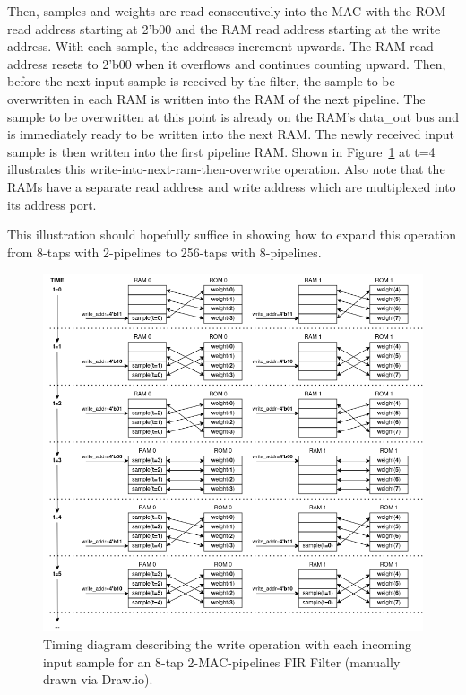 \documentclass{article}
\begin{document}
    Then, samples and weights are read consecutively into the MAC with the ROM read address starting at 2'b00 and the RAM read address starting at the write address.
    With each sample, the addresses increment upwards. The RAM read address resets to 2'b00 when it overflows and continues counting upward.
    Then, before the next input sample is received by the filter, the sample to be overwritten in each RAM is written into the RAM of the next pipeline.
    The sample to be overwritten at this point is already on the RAM's data\_out bus and is immediately ready to be written into the next RAM.
    The newly received input sample is then written into the first pipeline RAM.
    Shown in Figure~\ref{fig:read_write_operations} at t=4 illustrates this write-into-next-ram-then-overwrite operation.
    Also note that the RAMs have a separate read address and write address which are multiplexed into its address port.

    This illustration should hopefully suffice in showing how to expand this operation from 8-taps with 2-pipelines to 256-taps with 8-pipelines.

    \begin{figure}
        \centering
        \includegraphics[width=1.25\textwidth]{figures/read_write_operations.png}
        \caption{
            Timing diagram describing the write operation with each incoming input sample for an 8-tap 2-MAC-pipelines FIR Filter (manually drawn via Draw.io).
        }
        \label{fig:read_write_operations}
    \end{figure}
\end{document}
